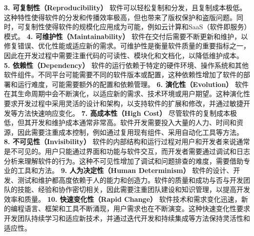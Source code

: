 \textbf{3. 可复制性（Reproducibility）}
软件可以轻松复制和分发，且复制成本极低。这种特性使得软件的分发和传播效率极高，但也带来了版权保护和盗版问题。同时，可复制性使得软件的规模化应用成为可能，例如云计算和SaaS（软件即服务）模式。 \textbf{4.
可维护性（Maintainability）} 软件在交付后需要不断更新和维护，以修复错误、优化性能或适应新的需求。可维护性是衡量软件质量的重要指标之一，因此在开发过程中需要注重代码的可读性、模块化和文档化，以降低维护成本。
\textbf{5. 依赖性（Dependency）} 软件的运行依赖于特定的硬件环境、操作系统和其他软件组件。不同平台可能需要不同的软件版本或配置，这种依赖性增加了软件的部署和运行难度，可能需要额外的配置和依赖管理。 \textbf{6.
演化性（Evolution）} 软件在其生命周期中会不断演化，以适应新的需求、技术环境或用户期望。这种演化性要求开发过程中采用灵活的设计和架构，以支持软件的扩展和修改，并通过敏捷开发等方法快速响应变化。 \textbf{7.
高成本性（High Cost）} 尽管软件的复制成本极低，但其开发和维护成本通常非常高。软件开发需要投入大量的人力、时间和资源，因此需要注重成本控制，例如通过复用现有组件、采用自动化工具等方法。 \textbf{8.
不可见性（Invisibility）}
软件的内部结构和运行过程对用户和开发者来说通常是不可见的。用户只能通过界面和功能与软件交互，而开发者需要通过调试和日志分析来理解软件的行为。这种不可见性增加了调试和问题排查的难度，需要借助专业的工具和方法。 \textbf{9.
人为决定性（Human Determinism）} 软件的设计、开发、测试和维护都高度依赖于人的能力和创造力。软件的质量和成功与否与开发团队的技能、经验和协作密切相关，因此需要注重团队建设和知识管理，以提高开发效率和质量。
\textbf{10. 快速变化性（Rapid Change）}
软件技术和需求变化迅速，新的编程语言、框架和工具不断涌现，用户需求也在不断演变。这种快速变化性要求开发团队持续学习和适应新技术，并通过迭代开发和持续集成等方法保持灵活性和适应性。
